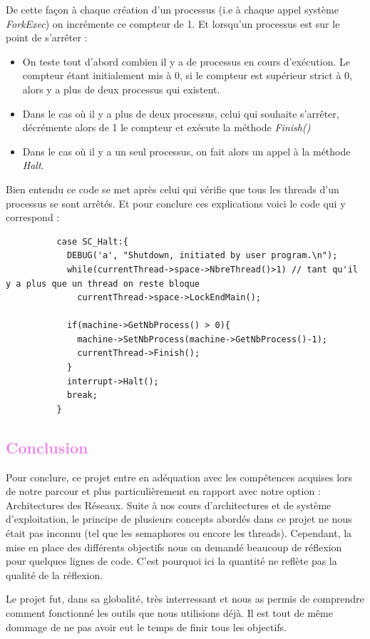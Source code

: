 \documentclass[a4paper,10pt]{report}
\begin{document}
  De cette façon à chaque création d'un processus (i.e à chaque appel système \emph{ForkExec}) on incrémente ce compteur de 1. Et lorsqu'un processus est 
  sur le point de s'arrêter : 
  \begin{itemize}
   \item On teste tout d'abord combien il y a de processus en cours d'exécution. Le compteur étant initialement mis à 0, si le compteur est supérieur 
   strict à 0, alors y a plus de deux processus qui existent.
   \item Dans le cas où il y a plus de deux processus, celui qui souhaite s'arrêter, décrémente alors de 1 le compteur et exécute la méthode \emph{Finish()}
   \item Dans le cas où il y a un seul processus, on fait alors un appel à la méthode \emph{Halt}.
  \end{itemize}
  Bien entendu ce code se met après celui qui vérifie que tous les threads d'un processus se sont arrêtés. Et pour conclure ces explications
  voici le code qui y correspond :
  \begin{lstlisting}
          case SC_Halt:{
            DEBUG('a', "Shutdown, initiated by user program.\n");
            while(currentThread->space->NbreThread()>1) // tant qu'il y a plus que un thread on reste bloque
              currentThread->space->LockEndMain();
            
            if(machine->GetNbProcess() > 0){
              machine->SetNbProcess(machine->GetNbProcess()-1);
              currentThread->Finish();
            }
            interrupt->Halt();
            break;
          }   
  \end{lstlisting}
   \textcolor{Violet}{\section{Conclusion}}
    Pour conclure, ce projet entre en adéquation avec les compétences acquises lors de notre parcour et plus particulièrement en rapport avec notre option :
  Architectures des Réseaux. Suite à nos cours d'architectures et de système d'exploitation, le principe de plusieurs concepts abordés dans ce projet
  ne nous était pas inconnu (tel que les semaphores ou encore les threads). 
  Cependant, la mise en place des différents objectifs nous on demandé beaucoup de réflexion pour quelques lignes de code.
  C'est pourquoi ici la quantité ne reflète pas la qualité de la réflexion.
  
    Le projet fut, dans sa globalité, très interressant et nous as permis de comprendre comment fonctionné les outils que nous utilisions déjà. 
    Il est tout de même dommage de ne pas avoir eut le temps de finir tous les objectifs.
\end{document}

